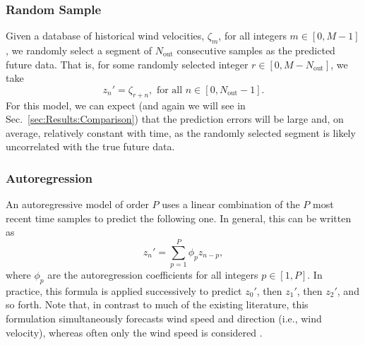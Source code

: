 \documentclass[11pt, oneside]{article}
\newcommand{\secref}[1]{Sec.~\ref{#1}}
\begin{document}
\subsubsection{Random Sample}
Given a database of historical wind velocities, $\zeta_m$, for all integers $m \in [0, M-1]$, we randomly select a segment of $N_\text{out}$ consecutive samples as the predicted future data.
That is, for some randomly selected integer $r \in [0, M - N_\text{out}]$, we take
\begin{equation}
z_n' = \zeta_{r+n}, \text{ for all } n \in [0, N_\text{out} - 1].
\end{equation}
For this model, we can expect (and again we will see in \secref{sec:Results:Comparison}) that the prediction errors will be large and, on average, relatively constant with time, as the randomly selected segment is likely uncorrelated with the true future data.

\subsubsection{Autoregression}\label{sec:Models:Autoregression}
An autoregressive model of order $P$ uses a linear combination of the $P$ most recent time samples to predict the following one.
In general, this can be written as
\begin{equation}
z_n' = \sum_{p = 1}^P \phi_p z_{n-p},
\end{equation}
where $\phi_p$ are the autoregression coefficients for all integers $p \in [1, P]$.
In practice, this formula is applied successively to predict $z_0'$, then $z_1'$, then $z_2'$, and so forth.
Note that, in contrast to much of the existing literature, this formulation simultaneously forecasts wind speed and direction (i.e., wind velocity), whereas often only the wind speed is considered \citep[for example]{Brown1984}.
\end{document}
